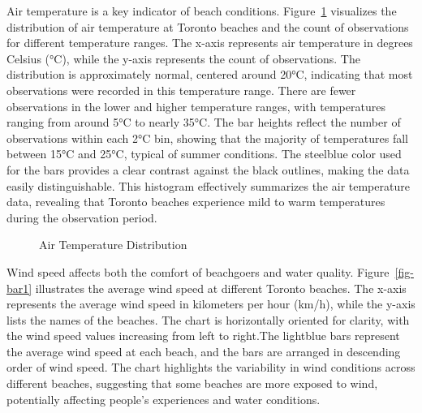 \documentclass[
  letterpaper,
  DIV=11,
  numbers=noendperiod]{scrartcl}
\begin{document}
Air temperature is a key indicator of beach conditions.
Figure~\ref{fig-his1} visualizes the distribution of air temperature at
Toronto beaches and the count of observations for different temperature
ranges. The x-axis represents air temperature in degrees Celsius (°C),
while the y-axis represents the count of observations. The distribution
is approximately normal, centered around 20°C, indicating that most
observations were recorded in this temperature range. There are fewer
observations in the lower and higher temperature ranges, with
temperatures ranging from around 5°C to nearly 35°C. The bar heights
reflect the number of observations within each 2°C bin, showing that the
majority of temperatures fall between 15°C and 25°C, typical of summer
conditions. The steelblue color used for the bars provides a clear
contrast against the black outlines, making the data easily
distinguishable. This histogram effectively summarizes the air
temperature data, revealing that Toronto beaches experience mild to warm
temperatures during the observation period.

\begin{figure}


\caption{\label{fig-his1}Air Temperature Distribution}

\end{figure}%

Wind speed affects both the comfort of beachgoers and water quality.
Figure~\ref{fig-bar1} illustrates the average wind speed at different
Toronto beaches. The x-axis represents the average wind speed in
kilometers per hour (km/h), while the y-axis lists the names of the
beaches. The chart is horizontally oriented for clarity, with the wind
speed values increasing from left to right.The lightblue bars represent
the average wind speed at each beach, and the bars are arranged in
descending order of wind speed. The chart highlights the variability in
wind conditions across different beaches, suggesting that some beaches
are more exposed to wind, potentially affecting people's experiences and
water conditions.
\end{document}
